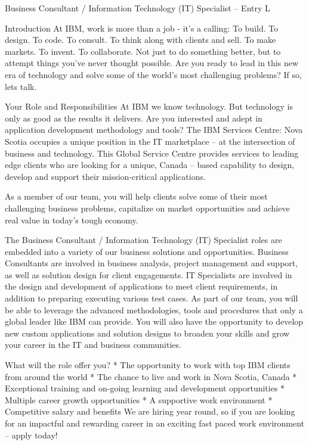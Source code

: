 Business Consultant / Information Technology (IT) Specialist – Entry L

Introduction
At IBM, work is more than a job - it's a calling: To build. To design. To code. To consult. To think along with clients and sell. To make markets. To invent. To collaborate. Not just to do something better, but to attempt things you've never thought possible. Are you ready to lead in this new era of technology and solve some of the world's most challenging problems? If so, lets talk.


Your Role and Responsibilities
At IBM we know technology. But technology is only as good as the results it delivers. Are you interested and adept in application development methodology and tools? The IBM Services Centre: Nova Scotia occupies a unique position in the IT marketplace – at the intersection of business and technology. This Global Service Centre provides services to leading edge clients who are looking for a unique, Canada – based capability to design, develop and support their mission-critical applications.

As a member of our team, you will help clients solve some of their most challenging business problems, capitalize on market opportunities and achieve real value in today’s tough economy.

The Business Consultant / Information Technology (IT) Specialist roles are embedded into a variety of our business solutions and opportunities. Business Consultants are involved in business analysis, project management and support, as well as solution design for client engagements. IT Specialists are involved in the design and development of applications to meet client requirements, in addition to preparing executing various test cases. As part of our team, you will be able to leverage the advanced methodologies, tools and procedures that only a global leader like IBM can provide. You will also have the opportunity to develop new custom applications and solution designs to broaden your skills and grow your career in the IT and business communities.

What will the role offer you?
* The opportunity to work with top IBM clients from around the world
* The chance to live and work in Nova Scotia, Canada
* Exceptional training and on-going learning and development opportunities
* Multiple career growth opportunities
* A supportive work environment
* Competitive salary and benefits
We are hiring year round, so if you are looking for an impactful and rewarding career in an exciting fast paced work environment – apply today!

